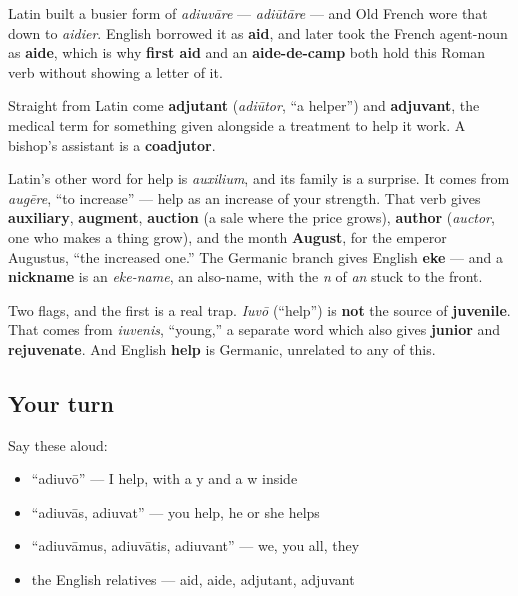 \begin{cousinweb}
Latin built a busier form of \emph{adiuvāre} — \emph{adiūtāre} — and Old French wore that down to \emph{aidier}. English borrowed it as \textbf{aid}, and later took the French agent-noun as \textbf{aide}, which is why \textbf{first aid} and an \textbf{aide-de-camp} both hold this Roman verb without showing a letter of it.

Straight from Latin come \textbf{adjutant} (\emph{adiūtor}, \textquotedblleft{}a helper\textquotedblright{}) and \textbf{adjuvant}, the medical term for something given alongside a treatment to help it work. A bishop's assistant is a \textbf{coadjutor}.

Latin's other word for help is \emph{auxilium}, and its family is a surprise. It comes from \emph{augēre}, \textquotedblleft{}to increase\textquotedblright{} — help as an increase of your strength. That verb gives \textbf{auxiliary}, \textbf{augment}, \textbf{auction} (a sale where the price grows), \textbf{author} (\emph{auctor}, one who makes a thing grow), and the month \textbf{August}, for the emperor Augustus, \textquotedblleft{}the increased one.\textquotedblright{} The Germanic branch gives English \textbf{eke} — and a \textbf{nickname} is an \emph{eke-name}, an also-name, with the \emph{n} of \emph{an} stuck to the front.

Two flags, and the first is a real trap. \emph{Iuvō} (\textquotedblleft{}help\textquotedblright{}) is \textbf{not} the source of \textbf{juvenile}. That comes from \emph{iuvenis}, \textquotedblleft{}young,\textquotedblright{} a separate word which also gives \textbf{junior} and \textbf{rejuvenate}. And English \textbf{help} is Germanic, unrelated to any of this.
\end{cousinweb}

\subsection*{Your turn}
Say these aloud:

\begin{itemize}
\raggedright
  \item \textquotedblleft{}adiuvō\textquotedblright{} — I help, with a y and a w inside
  \item \textquotedblleft{}adiuvās, adiuvat\textquotedblright{} — you help, he or she helps
  \item \textquotedblleft{}adiuvāmus, adiuvātis, adiuvant\textquotedblright{} — we, you all, they
  \item the English relatives — aid, aide, adjutant, adjuvant
\end{itemize}

